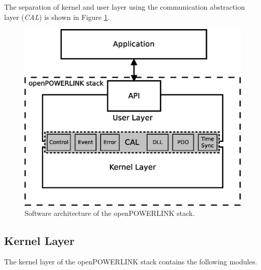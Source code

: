 The separation of kernel and user layer using the communication abstraction layer (\emph{CAL}) is shown in Figure \ref{fig:openpowerlink_arch}.

\begin{figure}
\centering
\includegraphics[width=0.9\linewidth]{images/openpowerlink_arch}
\caption{Software architecture of the openPOWERLINK stack.}
\label{fig:openpowerlink_arch}
\end{figure}


\subsection{Kernel Layer}
\label{sec:oplk_architecture_kernel}

The kernel layer of the openPOWERLINK stack contains the following modules. \cite[openPOWERLINK Kernel Layer]{openpowerlink_doc}

